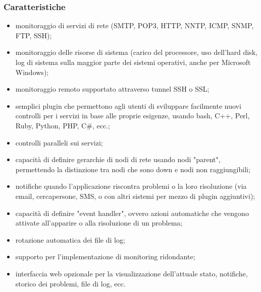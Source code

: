 \documentclass{article}
\begin{document}
\subsubsection{Caratteristiche}
\begin{itemize}
    \item monitoraggio di servizi di rete (SMTP, POP3, HTTP, NNTP, ICMP, SNMP, FTP, SSH);
    \item monitoraggio delle risorse di sistema (carico del processore, uso dell'hard disk, log di sistema sulla maggior parte dei sistemi operativi, anche per Microsoft Windows);
    \item monitoraggio remoto supportato attraverso tunnel SSH o SSL;
    \item semplici plugin che permettono agli utenti di sviluppare facilmente nuovi controlli per i servizi in base alle proprie esigenze, usando bash, C++, Perl, Ruby, Python, PHP, C\#, ecc.;
    \item controlli paralleli sui servizi;
    \item capacità di definire gerarchie di nodi di rete usando nodi "parent", permettendo la distinzione tra nodi che sono down e nodi non raggiungibili;
    \item notifiche quando l'applicazione riscontra problemi o la loro risoluzione (via email, cercapersone, SMS, o con altri sistemi per mezzo di plugin aggiuntivi);
    \item capacità di definire "event handler", ovvero azioni automatiche che vengono attivate all'apparire o alla risoluzione di un problema;
    \item rotazione automatica dei file di log;
    \item supporto per l'implementazione di monitoring ridondante;
    \item interfaccia web opzionale per la visualizzazione dell'attuale stato, notifiche, storico dei problemi, file di log, ecc.
\end{itemize}
\end{document}
